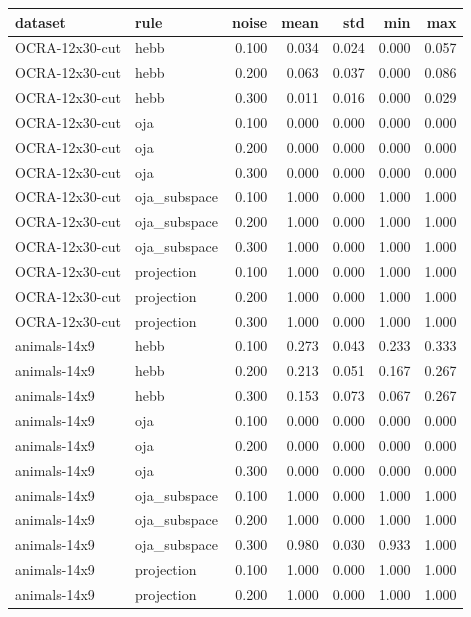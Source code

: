 \begin{tabular}{llrrrrr}
\toprule
dataset & rule & noise & mean & std & min & max \\
\midrule
OCRA-12x30-cut & hebb & 0.100 & 0.034 & 0.024 & 0.000 & 0.057 \\
OCRA-12x30-cut & hebb & 0.200 & 0.063 & 0.037 & 0.000 & 0.086 \\
OCRA-12x30-cut & hebb & 0.300 & 0.011 & 0.016 & 0.000 & 0.029 \\
OCRA-12x30-cut & oja & 0.100 & 0.000 & 0.000 & 0.000 & 0.000 \\
OCRA-12x30-cut & oja & 0.200 & 0.000 & 0.000 & 0.000 & 0.000 \\
OCRA-12x30-cut & oja & 0.300 & 0.000 & 0.000 & 0.000 & 0.000 \\
OCRA-12x30-cut & oja\_subspace & 0.100 & 1.000 & 0.000 & 1.000 & 1.000 \\
OCRA-12x30-cut & oja\_subspace & 0.200 & 1.000 & 0.000 & 1.000 & 1.000 \\
OCRA-12x30-cut & oja\_subspace & 0.300 & 1.000 & 0.000 & 1.000 & 1.000 \\
OCRA-12x30-cut & projection & 0.100 & 1.000 & 0.000 & 1.000 & 1.000 \\
OCRA-12x30-cut & projection & 0.200 & 1.000 & 0.000 & 1.000 & 1.000 \\
OCRA-12x30-cut & projection & 0.300 & 1.000 & 0.000 & 1.000 & 1.000 \\
animals-14x9 & hebb & 0.100 & 0.273 & 0.043 & 0.233 & 0.333 \\
animals-14x9 & hebb & 0.200 & 0.213 & 0.051 & 0.167 & 0.267 \\
animals-14x9 & hebb & 0.300 & 0.153 & 0.073 & 0.067 & 0.267 \\
animals-14x9 & oja & 0.100 & 0.000 & 0.000 & 0.000 & 0.000 \\
animals-14x9 & oja & 0.200 & 0.000 & 0.000 & 0.000 & 0.000 \\
animals-14x9 & oja & 0.300 & 0.000 & 0.000 & 0.000 & 0.000 \\
animals-14x9 & oja\_subspace & 0.100 & 1.000 & 0.000 & 1.000 & 1.000 \\
animals-14x9 & oja\_subspace & 0.200 & 1.000 & 0.000 & 1.000 & 1.000 \\
animals-14x9 & oja\_subspace & 0.300 & 0.980 & 0.030 & 0.933 & 1.000 \\
animals-14x9 & projection & 0.100 & 1.000 & 0.000 & 1.000 & 1.000 \\
animals-14x9 & projection & 0.200 & 1.000 & 0.000 & 1.000 & 1.000 \\

\end{tabular}
